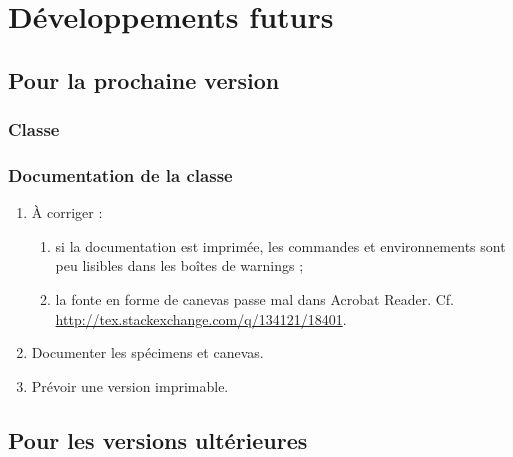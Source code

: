 \chapter{Développements futurs}\label{cha:devel-futurs}

\section{Pour la prochaine version}
\label{sec:pour-la-prochaine}

\subsection{Classe}


\subsection{Documentation de la classe}
\label{sec:documentation-de-la}

\begin{enumerate}
\item À corriger :
  \begin{enumerate}
  \item si la documentation est imprimée, les commandes et environnements sont
    peu lisibles dans les boîtes de warnings ;
  \item la fonte en forme de canevas passe mal dans Acrobat
    Reader. Cf. \url{http://tex.stackexchange.com/q/134121/18401}.
  \end{enumerate}
\item Documenter les spécimens et canevas.
\item Prévoir une version imprimable.
\end{enumerate}

\section{Pour les versions ultérieures}
\label{sec:pour-les-versions}

